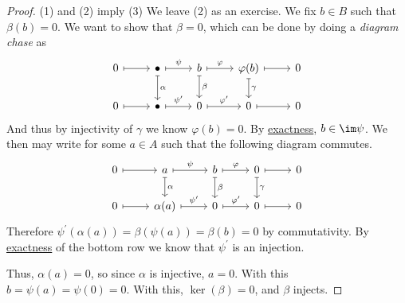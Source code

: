 \begin{proof}
	(1) and (2) imply (3) We leave (2) as an exercise. We fix \(b \in B\) such that \(\beta(b) = 0\). We want to show that \(\beta = 0\),
	which can be done by doing a \emph{diagram chase} as
	\[
		\begin{tikzcd}
			0 & {\bullet } & b & {\varphi(b)} & 0 \\
			0 & {\bullet } & 0 & 0 & 0
			\arrow[maps to, from=1-1, to=1-2]
			\arrow["\psi", maps to, from=1-2, to=1-3]
			\arrow["\varphi", maps to, from=1-3, to=1-4]
			\arrow[maps to, from=1-4, to=1-5]
			\arrow["\gamma", maps to, from=1-4, to=2-4]
			\arrow[maps to, from=2-4, to=2-5]
			\arrow["{\varphi^\prime}", maps to, from=2-3, to=2-4]
			\arrow["\beta", maps to, from=1-3, to=2-3]
			\arrow["{\psi^\prime}", maps to, from=2-2, to=2-3]
			\arrow["\alpha", maps to, from=1-2, to=2-2]
			\arrow[maps to, from=2-1, to=2-2]
		\end{tikzcd}
	\]
	And thus by injectivity of \(\gamma\) we know \(\varphi(b) = 0\). By \hyperref[def:exact]{exactness}, \(b \in \im \psi\). We then
	may write for some \(a \in A\) such that the following diagram commutes.
	\[
		\begin{tikzcd}
			0 & a & b & 0 & 0 \\
			0 & {\alpha(a)} & 0 & 0 & 0
			\arrow[maps to, from=1-1, to=1-2]
			\arrow["\varphi", maps to, from=1-3, to=1-4]
			\arrow[maps to, from=1-4, to=1-5]
			\arrow["\gamma", maps to, from=1-4, to=2-4]
			\arrow[maps to, from=2-4, to=2-5]
			\arrow["{\varphi^\prime}", maps to, from=2-3, to=2-4]
			\arrow["\beta", maps to, from=1-3, to=2-3]
			\arrow["{\psi^\prime}", maps to, from=2-2, to=2-3]
			\arrow["\alpha", maps to, from=1-2, to=2-2]
			\arrow[maps to, from=2-1, to=2-2]
			\arrow["\psi", maps to, from=1-2, to=1-3]
		\end{tikzcd}
	\]
	Therefore \(\psi^\prime (\alpha(a)) = \beta(\psi(a)) = \beta(b) = 0\) by commutativity. By \hyperref[def:exact-sequence]{exactness} of the
	bottom row we know that \(\psi^\prime\) is an injection.

	Thus, \(\alpha(a) = 0\), so since \(\alpha\) is injective, \(a = 0\). With this \(b = \psi(a) = \psi(0) = 0\). With this,
	\(\ker(\beta) = 0\), and \(\beta\) injects.
\end{proof}

